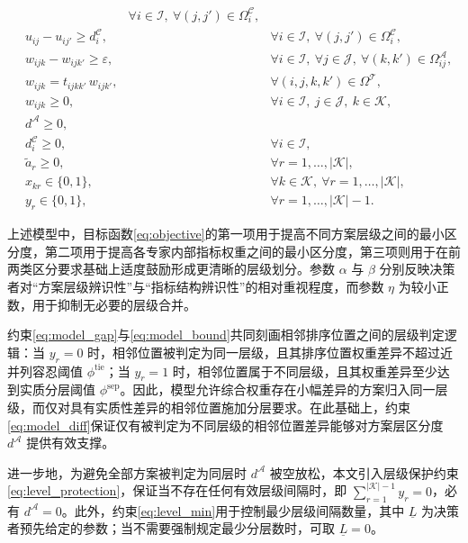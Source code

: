 \documentclass{article}
\begin{document}
\begin{align}
    && \forall i\in\mathcal I,\ \forall (j,j')\in\Omega_i^{\mathcal C}, \\
    & u_{ij}-u_{ij'} \ge d_i^{\mathcal C},
    && \forall i\in\mathcal I,\ \forall (j,j')\in\Omega_i^{\mathcal C}, \\
    & w_{ijk}-w_{ijk'} \ge \varepsilon,
    && \forall i\in\mathcal I,\ \forall j\in\mathcal J,\ \forall (k,k')\in\Omega_{ij}^{\mathcal A}, \\
    & w_{ijk}=t_{ijkk'}\,w_{ijk'},
    && \forall (i,j,k,k')\in\Omega^{\mathcal T}, \\
    & w_{ijk}\ge 0,
    && \forall i\in\mathcal I,\ j\in\mathcal J,\ k\in\mathcal K, \\
    & d^{\mathcal A}\ge 0, \\
    & d_i^{\mathcal C}\ge 0,
    && \forall i\in\mathcal I, \\
    & \tilde a_r\ge 0,
    && \forall r=1,\dots,|\mathcal K|, \\
    & x_{kr}\in\{0,1\},
    && \forall k\in\mathcal K,\ \forall r=1,\dots,|\mathcal K|, \\
    & y_r\in\{0,1\},
    && \forall r=1,\dots,|\mathcal K|-1.
\end{align}

上述模型中，目标函数\eqref{eq:objective}的第一项用于提高不同方案层级之间的最小区分度，第二项用于提高各专家内部指标权重之间的最小区分度，第三项则用于在前两类区分要求基础上适度鼓励形成更清晰的层级划分。参数 $\alpha$ 与 $\beta$ 分别反映决策者对“方案层级辨识性”与“指标结构辨识性”的相对重视程度，而参数 $\eta$ 为较小正数，用于抑制无必要的层级合并。

约束\eqref{eq:model_gap}与\eqref{eq:model_bound}共同刻画相邻排序位置之间的层级判定逻辑：当 $y_r=0$ 时，相邻位置被判定为同一层级，且其排序位置权重差异不超过近并列容忍阈值 $\phi^{\mathrm{tie}}$；当 $y_r=1$ 时，相邻位置属于不同层级，且其权重差异至少达到实质分层阈值 $\phi^{\mathrm{sep}}$。因此，模型允许综合权重存在小幅差异的方案归入同一层级，而仅对具有实质性差异的相邻位置施加分层要求。在此基础上，约束\eqref{eq:model_diff}保证仅有被判定为不同层级的相邻位置差异能够对方案层区分度 $d^{\mathcal A}$ 提供有效支撑。

进一步地，为避免全部方案被判定为同层时 $d^{\mathcal A}$ 被空放松，本文引入层级保护约束\eqref{eq:level_protection}，保证当不存在任何有效层级间隔时，即 $\sum_{r=1}^{|\mathcal K|-1} y_r=0$，必有 $d^{\mathcal A}=0$。此外，约束\eqref{eq:level_min}用于控制最少层级间隔数量，其中 $\underline L$ 为决策者预先给定的参数；当不需要强制规定最少分层数时，可取 $\underline L=0$。
\end{document}
